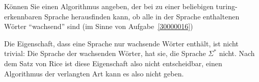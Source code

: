 Können Sie einen Algorithmus angeben, der bei zu einer beliebigen
turing-erkennbaren
Sprache herausfinden kann, ob alle in der Sprache enthaltenen Wörter
``wachsend'' sind (im Sinne von Aufgabe~\ref{30000016})


\begin{loesung}
Die Eigenschaft, dass eine Sprache nur wachsende Wörter
enthält, ist nicht trivial: Die Sprache der wachsenden
Wörter, hat sie, die Sprache $\Sigma^*$ nicht. Nach dem
Satz von Rice ist diese Eigenschaft also nicht entscheidbar,
einen Algorithmus der verlangten Art kann es also nicht geben.
\end{loesung}
